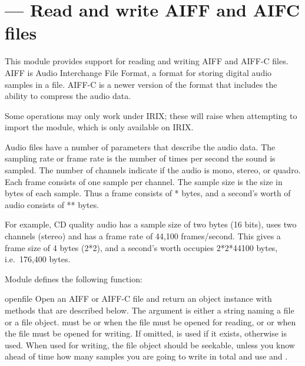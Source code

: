 \section{ ---
         Read and write AIFF and AIFC files}



This module provides support for reading and writing AIFF and AIFF-C
files.  AIFF is Audio Interchange File Format, a format for storing
digital audio samples in a file.  AIFF-C is a newer version of the
format that includes the ability to compress the audio data.

  Some operations may only work under IRIX; these will
raise  when attempting to import the
 module, which is only available on IRIX.

Audio files have a number of parameters that describe the audio data.
The sampling rate or frame rate is the number of times per second the
sound is sampled.  The number of channels indicate if the audio is
mono, stereo, or quadro.  Each frame consists of one sample per
channel.  The sample size is the size in bytes of each sample.  Thus a
frame consists of * bytes, and a
second's worth of audio consists of
** bytes.

For example, CD quality audio has a sample size of two bytes (16
bits), uses two channels (stereo) and has a frame rate of 44,100
frames/second.  This gives a frame size of 4 bytes (2*2), and a
second's worth occupies 2*2*44100 bytes, i.e.\ 176,400 bytes.

Module  defines the following function:

\begin{funcdesc}{open}{file}
Open an AIFF or AIFF-C file and return an object instance with
methods that are described below.  The argument  is either a
string naming a file or a file object.   must be 
or  when the file must be opened for reading, or  
or  when the file must be opened for writing.  If omitted,
 is used if it exists, otherwise  is
used.  When used for writing, the file object should be seekable,
unless you know ahead of time how many samples you are going to write
in total and use  and .
\end{funcdesc}

